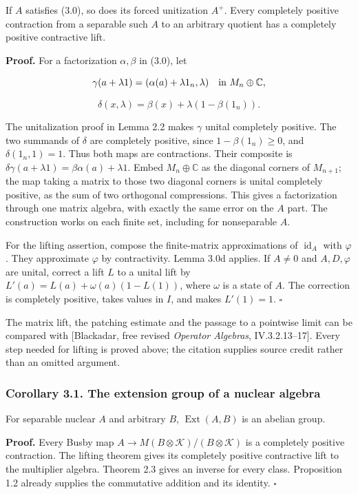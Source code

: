 \documentclass[
  11pt,
]{article}
\begin{document}
If \(A\) satisfies (3.0), so does its forced unitization \(A^+\). Every
completely positive contraction from a separable such \(A\) to an
arbitrary quotient has a completely positive contractive lift.

\textbf{Proof.} For a factorization \(\alpha,\beta\) in (3.0), let

\[
\gamma(a+\lambda1)=(\alpha(a)+\lambda1_n,\lambda)
\quad\hbox{in }M_n\oplus\mathbb C,
\]

\[
\delta(x,\lambda)=\beta(x)+\lambda(1-\beta(1_n)).
\]

The unitalization proof in Lemma 2.2 makes \(\gamma\) unital completely
positive. The two summands of \(\delta\) are completely positive, since
\(1-\beta(1_n)\geq0\), and \(\delta(1_n,1)=1\). Thus both maps are
contractions. Their composite is
\(\delta\gamma(a+\lambda1)=\beta\alpha(a)+\lambda1\). Embed
\(M_n\oplus\mathbb C\) as the diagonal corners of \(M_{n+1}\); the map
taking a matrix to those two diagonal corners is unital completely
positive, as the sum of two orthogonal compressions. This gives a
factorization through one matrix algebra, with exactly the same error on
the \(A\) part. The construction works on each finite set, including for
nonseparable \(A\).

For the lifting assertion, compose the finite-matrix approximations of
\(\operatorname{id}_A\) with \(\varphi\). They approximate \(\varphi\)
by contractivity. Lemma 3.0d applies. If \(A\ne0\) and \(A,D,\varphi\)
are unital, correct a lift \(L\) to a unital lift by
\(L'(a)=L(a)+\omega(a)(1-L(1))\), where \(\omega\) is a state of \(A\).
The correction is completely positive, takes values in \(I\), and makes
\(L'(1)=1\). \(\square\)

The matrix lift, the patching estimate and the passage to a pointwise
limit can be compared with {[}Blackadar, free revised \emph{Operator
Algebras}, IV.3.2.13--17{]}. Every step needed for lifting is proved
above; the citation supplies source credit rather than an omitted
argument.

\subsubsection{Corollary 3.1. The extension group of a nuclear
algebra}\label{corollary-3.1.-the-extension-group-of-a-nuclear-algebra}

For separable nuclear \(A\) and arbitrary \(B\),
\(\operatorname{Ext}(A,B)\) is an abelian group.

\textbf{Proof.} Every Busby map
\(A\to M(B\otimes\mathcal K)/(B\otimes\mathcal K)\) is a completely
positive contraction. The lifting theorem gives its completely positive
contractive lift to the multiplier algebra. Theorem 2.3 gives an inverse
for every class. Proposition 1.2 already supplies the commutative
addition and its identity. \(\square\)
\end{document}
